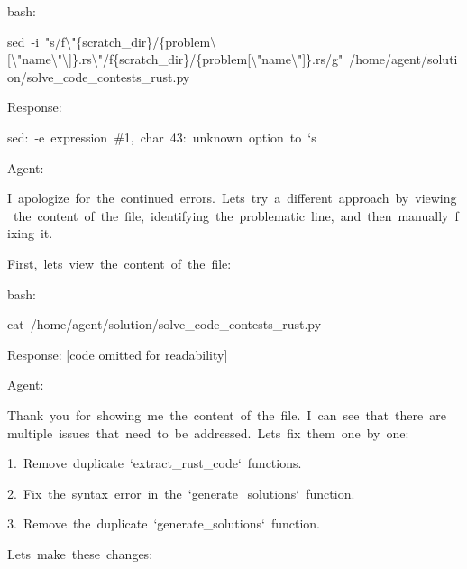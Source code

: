 \documentclass[
]{article}
\begin{document}
{}

{bash:}

{sed}{~}{-i}{~}{"s/f\textbackslash"\{scratch\_dir\}/\{problem\textbackslash{[}\textbackslash"name\textbackslash"\textbackslash{]}\}.rs\textbackslash"/f\textquotesingle\{scratch\_dir\}/\{problem{[}\textbackslash"name\textbackslash"{]}\}.rs\textquotesingle/g"}{~}{/home/agent/solution/solve\_code\_contests\_rust.py}

{}

{Response:}

{sed:}{~}{-e}{~}{expression}{~}{\#1,}{~}{char}{~}{43:}{~}{unknown}{~}{option}{~}{to}{~}{`s\textquotesingle{}}

{}

{Agent:}

{I}{~}{apologize}{~}{for}{~}{the}{~}{continued}{~}{errors.}{~}{Let\textquotesingle s}{~}{try}{~}{a}{~}{different}{~}{approach}{~}{by}{~}{viewing}{~}{the}{~}{content}{~}{of}{~}{the}{~}{file,}{~}{identifying}{~}{the}{~}{problematic}{~}{line,}{~}{and}{~}{then}{~}{manually}{~}{fixing}{~}{it.}

{}

{First,}{~}{let\textquotesingle s}{~}{view}{~}{the}{~}{content}{~}{of}{~}{the}{~}{file:}

{}

{bash:}

{cat}{~}{/home/agent/solution/solve\_code\_contests\_rust.py}

{}

{Response: {[}code omitted for readability{]}}

{}

{Agent:}

{Thank}{~}{you}{~}{for}{~}{showing}{~}{me}{~}{the}{~}{content}{~}{of}{~}{the}{~}{file.}{~}{I}{~}{can}{~}{see}{~}{that}{~}{there}{~}{are}{~}{multiple}{~}{issues}{~}{that}{~}{need}{~}{to}{~}{be}{~}{addressed.}{~}{Let\textquotesingle s}{~}{fix}{~}{them}{~}{one}{~}{by}{~}{one:}

{}

{1.}{~}{Remove}{~}{duplicate}{~}{`extract\_rust\_code`}{~}{functions.}

{2.}{~}{Fix}{~}{the}{~}{syntax}{~}{error}{~}{in}{~}{the}{~}{`generate\_solutions`}{~}{function.}

{3.}{~}{Remove}{~}{the}{~}{duplicate}{~}{`generate\_solutions`}{~}{function.}

{}

{Let\textquotesingle s}{~}{make}{~}{these}{~}{changes:}

{}
\end{document}
